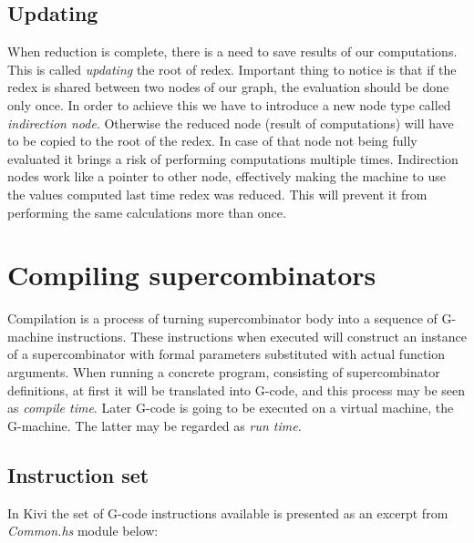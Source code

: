 \documentclass[12pt,a4paper]{report}
\begin{document}
\subsection{Updating}
\label{sec:updating}
When reduction is complete, there is a need to save results of our
computations. This is called \textit{updating} the root of redex. Important
thing to notice is that if the redex is shared between two nodes of our graph,
the evaluation should be done only once. In order to achieve this we have to
introduce a new node type called \textit{indirection node}. Otherwise the
reduced node (result of computations) will have to be copied to the root of
the redex. In case of that node not being fully evaluated it brings a risk of
performing computations multiple times. Indirection nodes work like a pointer
to other node, effectively making the machine to use the values computed last
time redex was reduced. This will prevent it from performing the same
calculations more than once.

%
%
%

\section{Compiling supercombinators}
Compilation is a process of turning supercombinator body into a sequence of
G-machine instructions. These instructions when executed will construct an
instance of a supercombinator with formal parameters substituted with actual
function arguments. When running a concrete program, consisting of
supercombinator definitions, at first it will be translated into G-code, and this
process may be seen as \textit{compile time}. Later G-code is going to be
executed on a virtual machine, the G-machine. The latter may be regarded as
\textit{run time}.


\subsection{Instruction set}
In Kivi the set of G-code instructions available is presented as an excerpt
from \textit{Common.hs} module below:
\end{document}
